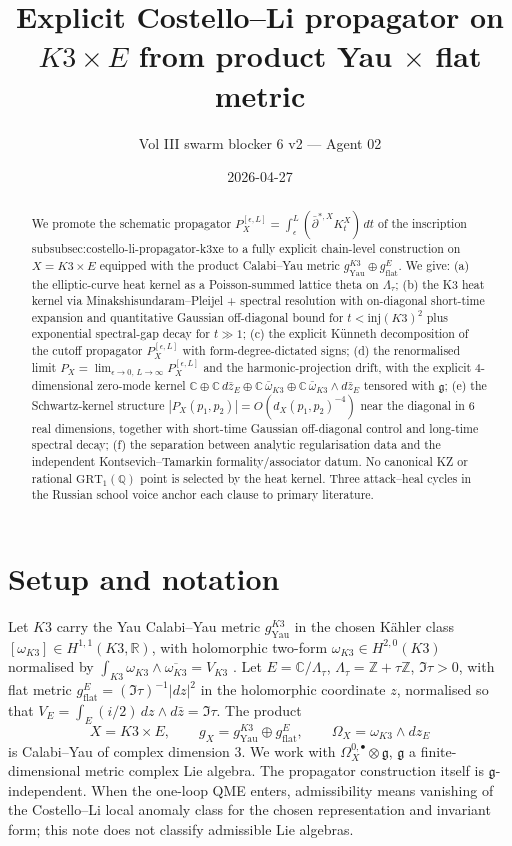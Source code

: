 \documentclass[11pt]{amsart}
\title{Explicit Costello--Li propagator on $K3\times E$ from
       product Yau $\times$ flat metric}
\author{Vol III swarm blocker 6 v2 --- Agent 02}
\date{2026-04-27}
\providecommand{\dbar}{\bar\partial}
\providecommand{\C}{\mathbb{C}}
\providecommand{\R}{\mathbb{R}}
\providecommand{\Z}{\mathbb{Z}}
\providecommand{\Q}{\mathbb{Q}}
\providecommand{\frakg}{\mathfrak{g}}
\providecommand{\GRT}{\mathrm{GRT}}
\theoremstyle{definition}
\theoremstyle{remark}
\begin{document}
\maketitle

\begin{abstract}
We promote the schematic propagator
$P_X^{[\epsilon,L]} = \int_\epsilon^L (\dbar^{*,X} K_t^X)\,dt$
of the inscription
\textsf{subsubsec:costello-li-propagator-k3xe} to a fully explicit
chain-level construction on $X = K3 \times E$ equipped with the
product Calabi--Yau metric $g_{\mathrm{Yau}}^{K3} \oplus
g_{\mathrm{flat}}^E$. We give: (a) the elliptic-curve heat kernel as
a Poisson-summed lattice theta on $\Lambda_\tau$; (b) the K3
heat kernel via Minakshisundaram--Pleijel + spectral resolution
with on-diagonal short-time expansion and quantitative Gaussian
off-diagonal bound for $t < \mathrm{inj}(K3)^2$ plus exponential
spectral-gap decay for $t \gg 1$; (c) the explicit K\"unneth
decomposition of the cutoff propagator $P_X^{[\epsilon,L]}$ with
form-degree-dictated signs; (d) the renormalised limit
$P_X = \lim_{\epsilon \to 0,\, L \to \infty} P_X^{[\epsilon,L]}$ and
the harmonic-projection drift, with the explicit $4$-dimensional
zero-mode kernel $\C \oplus \C\,d\bar z_E \oplus \C\,\bar\omega_{K3}
\oplus \C\,\bar\omega_{K3} \wedge d\bar z_E$ tensored with $\frakg$;
(e) the Schwartz-kernel structure $|P_X(p_1,p_2)| = O(d_X(p_1,p_2)^{-4})$
near the diagonal in $6$ real dimensions, together with short-time
Gaussian off-diagonal control and long-time spectral decay; (f) the
separation between analytic regularisation data and the independent
Kontsevich--Tamarkin formality/associator datum. No canonical
KZ or rational $\GRT_1(\Q)$ point is selected by the heat kernel.
Three attack--heal cycles in the Russian school voice anchor
each clause to primary literature.
\end{abstract}

\section{Setup and notation}
\label{sec:setup}

Let $K3$ carry the Yau Calabi--Yau metric $g^{K3}_{\mathrm{Yau}}$ in
the chosen K\"ahler class $[\omega_{K3}] \in H^{1,1}(K3,\R)$, with
holomorphic two-form $\omega_{K3} \in H^{2,0}(K3)$ normalised by
$\int_{K3} \omega_{K3} \wedge \overline{\omega_{K3}} = V_{K3}$
\cite{Yau1978}. Let $E = \C/\Lambda_\tau$, $\Lambda_\tau = \Z + \tau\Z$,
$\Im\tau > 0$, with flat metric
$g_{\mathrm{flat}}^E = (\Im\tau)^{-1}|dz|^2$ in the holomorphic
coordinate $z$, normalised so that $V_E = \int_E (i/2)\,dz \wedge d\bar z = \Im\tau$.
The product
\[
  X = K3 \times E, \qquad
  g_X = g_{\mathrm{Yau}}^{K3} \oplus g_{\mathrm{flat}}^E,
  \qquad \Omega_X = \omega_{K3} \wedge dz_E
\]
is Calabi--Yau of complex dimension $3$. We work with
$\Omega^{0,\bullet}_X \otimes \frakg$, $\frakg$ a finite-dimensional
metric complex Lie algebra. The propagator construction itself is
$\frakg$-independent. When the one-loop QME enters, admissibility means
vanishing of the Costello--Li local anomaly class for the chosen
representation and invariant form; this note does not classify
admissible Lie algebras.
\end{document}
